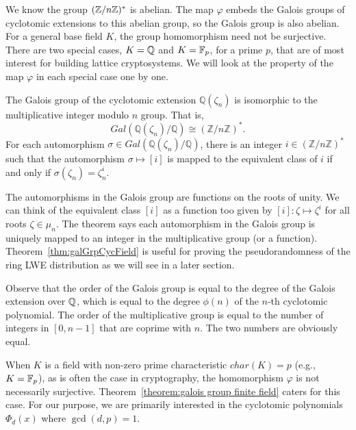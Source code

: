 \documentclass[../main.tex]{subfiles}
\begin{document}
We know the group $(\mathbb{Z}/n\mathbb{Z})^*$ is abelian. The map $\varphi$ embeds the Galois groups of cyclotomic extensions to this abelian group, so the Galois group is also abelian. For a general base field $K$, the group homomorphism need not be surjective. There are two special cases, $K=\mathbb{Q}$ and $K=\mathbb{F}_p$, for a prime $p$, that are of most interest for building lattice cryptosystems. We will look at the property of the map $\varphi$ in each special case one by one. 

\begin{theorem}
\label{thm:galGrpCycField}
The Galois group of the cyclotomic extension $\mathbb{Q}(\zeta_n)$ is isomorphic to the multiplicative integer modulo $n$ group.\reversemarginpar
{}
That is, 
\begin{equation*}
    Gal(\mathbb{Q}(\zeta_n) / \mathbb{Q}) \cong (\mathbb{Z}/ n\mathbb{Z})^*.
\end{equation*}
For each automorphism $\sigma \in Gal(\mathbb{Q}(\zeta_n) / \mathbb{Q})$, there is an integer $i \in (\mathbb{Z}/ n\mathbb{Z})^*$ such that the automorphism $\sigma \mapsto [i]$ is mapped to the equivalent class of $i$ if and only if $\sigma(\zeta_n) = \zeta_n^i$.
\end{theorem}
The automorphisms in the Galois group are functions on the roots of unity. We can think of the equivalent class $[i]$ as a function too given by $[i]:\zeta \mapsto \zeta^i$ for all roots $\zeta \in \mu_n$. The theorem says each automorphism in the Galois group is uniquely mapped to an integer in the multiplicative group  (or a function). 
Theorem~\ref{thm:galGrpCycField} is useful for proving the pseudorandomness of the ring LWE distribution as we will see in a later section.

Observe that the order of the Galois group is equal to the degree of the Galois extension over $\mathbb{Q}$, which is equal to the degree $\phi(n)$ of the $n$-th cyclotomic polynomial. The order of the multiplicative group is equal to the number of integers in $[0,n-1]$ that are coprime with $n$. 
The two numbers are obviously equal. 

When $K$ is a field with non-zero prime characteristic $char(K)=p$ (e.g., $K=\mathbb{F}_p$), as is often the case in cryptography, the homomorphism $\varphi$ is not necessarily surjective. 
Theorem~\ref{theorem:galois group finite field} caters for this case.
For our purpose, we are primarily interested in the cyclotomic polynomials $\Phi_d(x)$ where $\gcd(d, p)=1$. 
\end{document}
